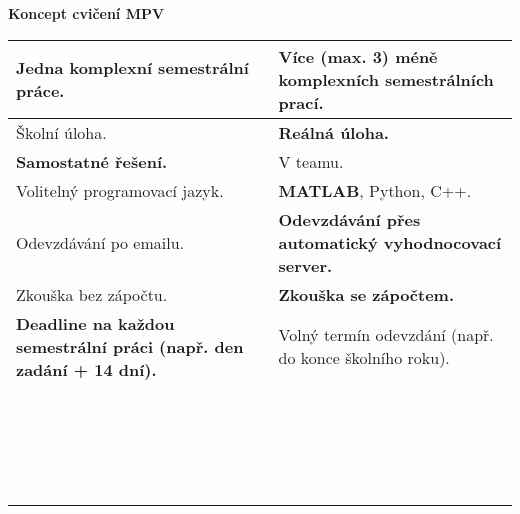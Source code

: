 \documentclass[12pt, a4paper]{report}
\begin{document}
\begin{titlepage}

\begin{center}
	\Huge{\textbf{Koncept cvičení MPV}}
\end{center}

\begin{table}[!ht]
	\centering
	\begin{tabular}{|p{7cm}|p{7cm}|}
		\hline
		{Jedna komplexní semestrální práce.} & {\textbf{Více (max. 3) méně komplexních semestrálních prací.} }\\
		\hline
		{Školní úloha.} & {\textbf{Reálná úloha.}}\\
		\hline		
		{\textbf{Samostatné řešení.}} & {V teamu.}\\
		\hline
		{Volitelný programovací jazyk.} & {\textbf{MATLAB}, Python, C++.}\\
		\hline
		{Odevzdávání po emailu.} & {\textbf{Odevzdávání přes automatický vyhodnocovací server.}}\\
		\hline
		{Zkouška bez zápočtu.} & {\textbf{Zkouška se zápočtem.}}\\
		\hline	
		{\textbf{Deadline na každou semestrální práci (např. den zadání + 14 dní).}} & {Volný termín odevzdání (např. do konce školního roku).}\\
		\hline	
		{} & {}\\
		\hline	
		{} & {}\\
		\hline	
		{} & {}\\
		\hline	
		{} & {}\\
		\hline	
		{} & {}\\
		\hline	
		{} & {}\\
		\hline	
		{} & {}\\
		\hline	
		{} & {}\\
		\hline	
		{} & {}\\
		\hline	
		{} & {}\\
		\hline	
		{} & {}\\
		\hline	
		{} & {}\\
		\hline	
		{} & {}\\
		\hline	
		{} & {}\\
		\hline	
		{} & {}\\
		\hline	
		{} & {}\\
		\hline	
		{} & {}\\
		\hline	
		{} & {}\\
		\hline	
		{} & {}\\
		\hline	
		{} & {}\\

\end{tabular}
\end{table}
\end{titlepage}
\end{document}
